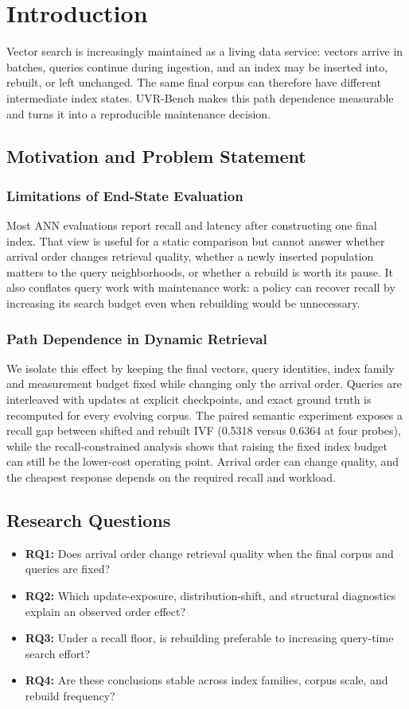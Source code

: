 \section{Introduction}
Vector search is increasingly maintained as a living data service: vectors arrive in
batches, queries continue during ingestion, and an index may be inserted into, rebuilt,
or left unchanged. The same final corpus can therefore have different intermediate
index states. UVR-Bench makes this path dependence measurable and turns it into a
reproducible maintenance decision.
\subsection{Motivation and Problem Statement}
\subsubsection{Limitations of End-State Evaluation}
Most ANN evaluations report recall and latency after constructing one final index.
That view is useful for a static comparison but cannot answer whether arrival order
changes retrieval quality, whether a newly inserted population matters to the query
neighborhoods, or whether a rebuild is worth its pause. It also conflates query work
with maintenance work: a policy can recover recall by increasing its search budget even
when rebuilding would be unnecessary.

\subsubsection{Path Dependence in Dynamic Retrieval}
We isolate this effect by keeping the final vectors, query identities, index family and
measurement budget fixed while changing only the arrival order. Queries are interleaved
with updates at explicit checkpoints, and exact ground truth is recomputed for every
evolving corpus. The paired semantic experiment exposes a recall gap between shifted
and rebuilt IVF (0.5318 versus 0.6364 at four probes), while the recall-constrained
analysis shows that raising the fixed index budget can still be the lower-cost operating
point. Arrival order can change quality, and the cheapest response depends on the
required recall and workload.

\subsection{Research Questions}
\begin{itemize}
\item \textbf{RQ1:} Does arrival order change retrieval quality when the final corpus and
queries are fixed?
\item \textbf{RQ2:} Which update-exposure, distribution-shift, and structural
diagnostics explain an observed order effect?
\item \textbf{RQ3:} Under a recall floor, is rebuilding preferable to increasing
query-time search effort?
\item \textbf{RQ4:} Are these conclusions stable across index families, corpus scale,
and rebuild frequency?
\end{itemize}

